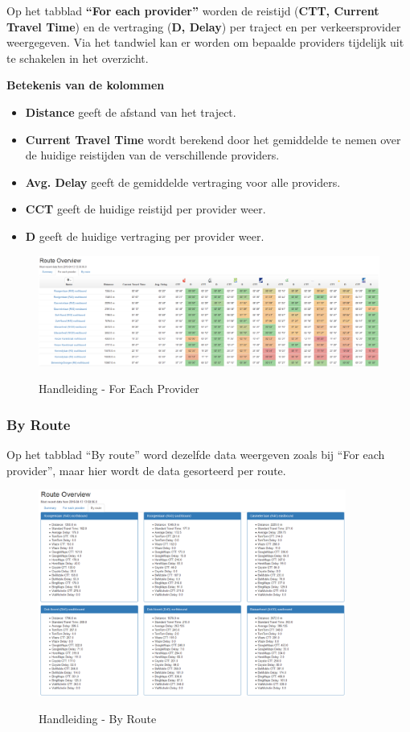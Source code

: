Op het tabblad \textbf{“For each provider”} worden de reistijd (\textbf{CTT, Current Travel Time}) en de vertraging (\textbf{D, Delay}) per traject en per verkeersprovider weergegeven. Via het tandwiel kan er worden om bepaalde providers tijdelijk uit te schakelen in het overzicht.

\textbf{Betekenis van de kolommen}
\begin{itemize} 
\item \textbf{Distance} geeft de afstand van het traject.
\item \textbf{Current Travel Time} wordt berekend door het gemiddelde te nemen over de huidige reistijden van de verschillende providers.
\item \textbf{Avg. Delay} geeft de gemiddelde vertraging voor alle providers.
\item \textbf{CCT} geeft de huidige reistijd per provider weer.
\item \textbf{D}  geeft de huidige vertraging per provider weer.
\end{itemize}

\begin{figure}[H]
\centering
\includegraphics[width=\textwidth]{images/forEachProvider.png}\\
\caption{Handleiding - For Each Provider}
\end{figure}

\subsubsection{By Route}

Op het tabblad “By route” word dezelfde data weergeven zoals bij “For each provider”, maar hier wordt de data gesorteerd per route.

\begin{figure}[H]
\centering
\includegraphics[width=0.9\textwidth]{images/byRoute.png}\\
\caption{Handleiding - By Route}
\end{figure}

